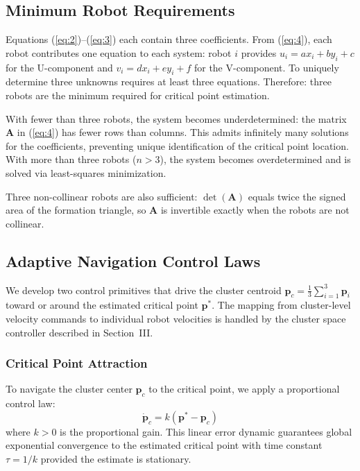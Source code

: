 \documentclass[lettersize,journal]{IEEEtran}
\begin{document}
\subsection{Minimum Robot Requirements}

Equations (\ref{eq:2})--(\ref{eq:3}) each contain three coefficients. From (\ref{eq:4}), each robot contributes one equation to each system: robot $i$ provides $u_i = ax_i + by_i + c$ for the U-component and $v_i = dx_i + ey_i + f$ for the V-component. To uniquely determine three unknowns requires at least three equations. Therefore: three robots are the minimum required for critical point estimation.

With fewer than three robots, the system becomes underdetermined: the matrix $\mathbf{A}$ in (\ref{eq:4}) has fewer rows than columns. This admits infinitely many solutions for the coefficients, preventing unique identification of the critical point location. With more than three robots ($n > 3$), the system becomes overdetermined and is solved via least-squares minimization.

Three non-collinear robots are also sufficient: $\det(\mathbf{A})$ equals twice the signed area of the formation triangle, so $\mathbf{A}$ is invertible exactly when the robots are not collinear.


\subsection{Adaptive Navigation Control Laws}
\label{sec:control_primitives}

We develop two control primitives that drive the cluster centroid $\mathbf{p}_c = \frac{1}{3}\sum_{i=1}^{3}\mathbf{p}_i$ toward or around the estimated critical point $\mathbf{p}^*$. The mapping from cluster-level velocity commands to individual robot velocities is handled by the cluster space controller described in Section~III.

\subsubsection{Critical Point Attraction}
To navigate the cluster center $\mathbf{p}_c$ to the critical point, we apply a proportional control law:
\begin{equation}\label{eq:10}
\dot{\mathbf{p}}_c = k(\mathbf{p}^* - \mathbf{p}_c)
\end{equation}
where $k > 0$ is the proportional gain. This linear error dynamic guarantees global exponential convergence to the estimated critical point with time constant $\tau = 1/k$ provided the estimate is stationary.
\end{document}
